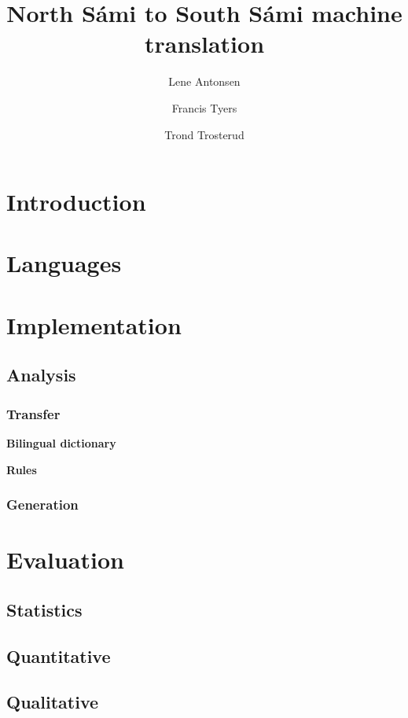 \documentclass[a4paper,11pt,twocolumn]{article}
\title{North Sámi to South Sámi machine translation}
\author{Lene Antonsen \and Francis Tyers \and Trond Trosterud}
\date{}
\begin{document}
\maketitle

\section{Introduction}

\cite{tyers09} \cite{wiechetek10}

\section{Languages}


\section{Implementation}


\subsection{Analysis}

\subsubsection{Transfer}

\textbf{Bilingual dictionary}

\textbf{Rules}

\subsubsection{Generation}

\section{Evaluation}

\subsection{Statistics}


\subsection{Quantitative}

\subsection{Qualitative}
\end{document}
